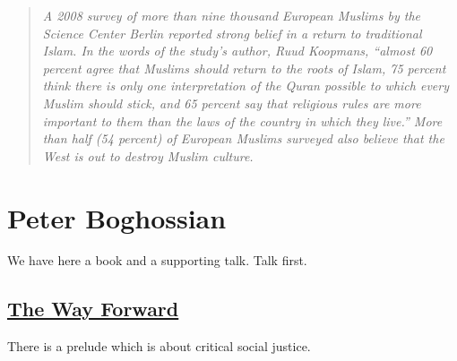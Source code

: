 \documentclass[10pt,titlepage]{book}
\begin{document}
\begin{quote}
{\it
A 2008 survey of more than nine thousand European Muslims
by the Science Center Berlin reported strong belief in a return
to traditional Islam. In the words of the study’s author, Ruud
Koopmans, “almost 60 percent agree that Muslims should return
to the roots of Islam, 75 percent think there is only one interpretation of the Quran possible to which every Muslim should stick,
and 65 percent say that religious rules are more important to
them than the laws of the country in which they live.” More than
half (54 percent) of European Muslims surveyed also believe
that the West is out to destroy Muslim culture.
}
\end{quote}

\section{Peter Boghossian}

We have here a book and a supporting talk.
Talk first.

\subsection{\href{https://www.youtube.com/watch?v=LiymUd9FjHA}{The Way Forward}}

There is a prelude which is about critical social justice.
\end{document}
